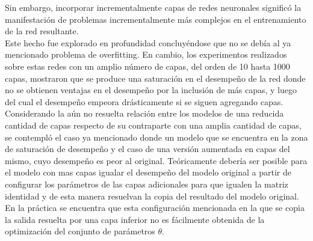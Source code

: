 \documentclass{article}
\begin{document}
	Sin embargo, incorporar incrementalmente capas de redes neuronales significó la manifestación de problemas incrementalmente más complejos en el entrenamiento de la red resultante\cite{6Generalization}.\\
	Este hecho fue explorado en profundidad concluyéndose que no se debía al ya mencionado problema de overfitting. En cambio, los experimentos realizados sobre estas redes\cite{28ResidualLearning} con un amplio número de capas, del orden de 10 hasta 1000 capas, mostraron que se produce una saturación en el desempeño de la red donde no se obtienen ventajas en el desempeño por la inclusión de más capas, y luego del cual el desempeño empeora drásticamente si se siguen agregando capas.\\
	
	Considerando la aún no resuelta relación entre los modelos de una reducida cantidad de capas respecto de su contraparte con una amplia cantidad de capas, se contempló el caso ya mencionado donde un modelo que se encuentra en la zona de saturación de desempeño y el caso de una versión aumentada en capas del mismo, cuyo desempeño es peor al original. Teóricamente debería ser posible para el modelo con mas capas igualar el desempeño del modelo original a partir de configurar los parámetros de las capas adicionales para que igualen la matriz identidad y de esta manera resuelvan la copia del resultado del modelo original. En la práctica se encuentra que esta configuración mencionada en la que se copia la salida resuelta por una capa inferior no es fácilmente obtenida de la optimización del conjunto de parámetros $\theta$\cite{28ResidualLearning}.\\
	
\end{document}
